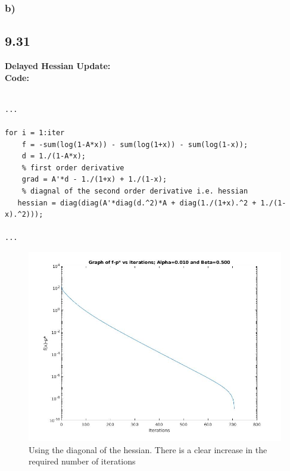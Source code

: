 \documentclass[12pt]{article}
\begin{document}
\subsubsection{b)}
\subsection*{9.31}
\textbf{Delayed Hessian Update:}\\

\textbf{Code:}
\begin{lstlisting}

...

for i = 1:iter
    f = -sum(log(1-A*x)) - sum(log(1+x)) - sum(log(1-x));
    d = 1./(1-A*x);
    % first order derivative
    grad = A'*d - 1./(1+x) + 1./(1-x);
    % diagnal of the second order derivative i.e. hessian
   hessian = diag(diag(A'*diag(d.^2)*A + diag(1./(1+x).^2 + 1./(1-x).^2)));
    
...
\end{lstlisting}
\begin{figure}[ht]
    \centering
    \includegraphics[width=\textwidth]{diagonal_hessian.jpg}
    \caption{Using the diagonal of the hessian. There is a clear increase in the required number of iterations}
\end{figure}
\break
\end{document}

